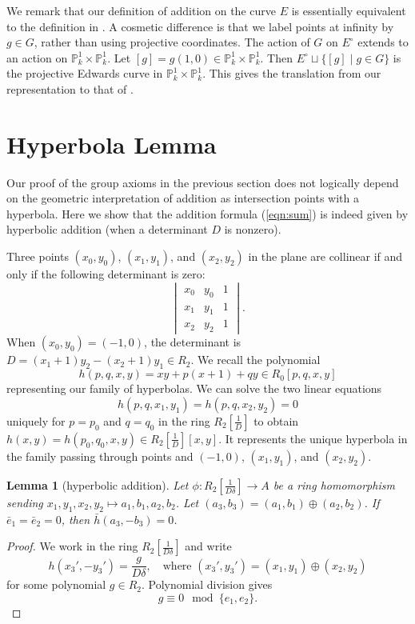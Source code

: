 \documentclass[12pt]{article}
\newtheorem{lemma}[theorem]{Lemma}
\newcommand{\ring}[1]{\mathbb{#1}}
\newcommand{\f}[1]{\frac{1}{#1}}
\newcommand{\Eoo}{E^{\circ}}
\def\cong{\equiv}
\begin{document}
We remark that our definition of addition on the curve $E$ is
essentially equivalent to the definition in
\cite{bernstein2011complete}.  A cosmetic difference is that we label
points at infinity by $g\in G$, rather than using projective
coordinates.  The action of $G$ on $\Eoo$ extends to an action on
$\ring{P}^1_k\times \ring{P}^1_k$.  Let $[g] = g (1,0)\in
\ring{P}^1_k\times \ring{P}^1_k$.  Then $\Eoo\sqcup \{[g]\mid g\in
G\}$ is the projective Edwards curve in $\ring{P}^1_k\times \ring{P}^1_k$.
This gives the translation from our representation to that of
\cite{bernstein2011complete}.

\section{Hyperbola Lemma}

Our proof of the group axioms in the previous section does not
logically depend on the geometric interpretation of addition as
intersection points with a hyperbola.  Here we show that the addition
formula (\ref{eqn:sum}) is indeed given by hyperbolic addition (when a
determinant $D$ is nonzero).

Three points $(x_0,y_0)$, $(x_1,y_1)$, and $(x_2,y_2)$ in the plane
are collinear if and only if the following determinant is zero:
\[
\begin{vmatrix}
x_0 & y_0 & 1\\
x_1 & y_1 & 1\\
x_2 & y_2 & 1
\end{vmatrix}.
\]
When $(x_0,y_0) = (-1,0)$, the determinant
is $D= (x_1+1) y_2 - (x_2+1) y_1\in R_2$. 
We recall the polynomial
\[
h(p,q,x,y) = x y + p (x+1) + q y \in R_0[p,q,x,y]
\]
representing our family of hyperbolas.
We can solve the two linear equations
\[
h(p,q,x_1,y_1)=h(p,q,x_2,y_2)=0
\]
uniquely for $p=p_0$ and $q=q_0$ in the ring $R_2[\f{D}]$ to obtain
$h(x,y) = h(p_0,q_0,x,y) \in R_2[\f{D}][x,y]$.  It represents the
unique hyperbola in the family passing through points and $(-1,0)$,
$(x_1,y_1)$, and $(x_2,y_2)$.
 
\begin{lemma}[hyperbolic addition]\label{lemma:hyperbola}
  Let $\phi:R_2[\f{D\delta}]\to A$ be a ring homomorphism sending
  $x_1,y_1,x_2,y_2\mapsto a_1,b_1,a_2,b_2$.  Let $(a_3,b_3) =
  (a_1,b_1)\oplus (a_2,b_2)$.  If $\bar e_1 = \bar e_2 = 0$, then
  $\bar h(a_3,-b_3) = 0$.
\end{lemma}

\begin{proof}
  We work in the ring $R_2[\f{D\delta}]$ and write
\[
h(x_3',-y_3') = \frac{g}{D\delta},\quad 
\text{where } (x_3',y_3') = (x_1,y_1)\oplus (x_2,y_2)
\]
for some polynomial $g \in R_2$.  Polynomial division gives
\begin{equation}\label{eqn:h}
g \cong 0 \mod \{e_1,e_2\}.
\end{equation}
\end{proof}
\end{document}
